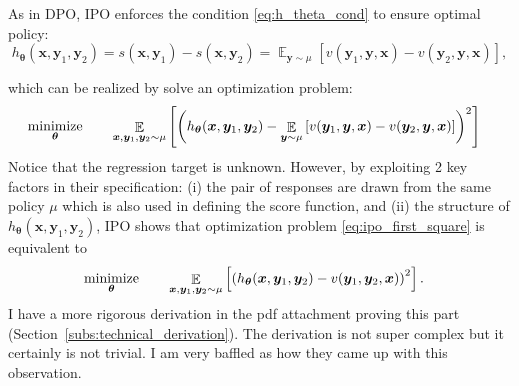 \documentclass[11pt,a4paper]{article}
\begin{document}
As in DPO, IPO enforces the condition \eqref{eq:h_theta_cond} to ensure optimal policy:
\[
h_{\boldsymbol \theta}(\bm{x}, \bm{y}_1, \bm{y}_2) = s(\bm{x}, \bm{y}_1) - s(\bm{x}, \bm{y}_2) = \mathop{\mathbb{E}}_{\bm{y} \sim \mu}[v(\bm{y}_1, \bm{y}, \bm{x}) - v(\bm{y}_2, \bm{y}, \bm{x})],
\]

which can be realized by solve an optimization problem:
\begin{alignat}{2}
    \label{eq:ipo_first_square}
    & \operatorname*{\text{minimize}}_{\boldsymbol \theta} \quad && \mathop{\mathbb{E}}_{\bm{x}, \bm{y}_1, \bm{y}_2\sim \mu} \left[ \left(  h_{\boldsymbol \theta}(\bm{x}, \bm{y}_1, \bm{y}_2)  - \mathop{\mathbb{E}}_{\bm{y} \sim \mu}\left[v(\bm{y}_1, \bm{y}, \bm{x}) - v(\bm{y}_2, \bm{y}, \bm{x}) \right] \right) ^2\right]
\end{alignat}
Notice that the regression target is unknown. However, by exploiting 2 key factors in their specification: (i) the pair of responses are drawn from the same policy $\mu$ which is also used in defining the score function, and (ii) the structure of $h_{\boldsymbol \theta}(\bm{x}, \bm{y}_1, \bm{y}_2)$, IPO shows that optimization problem \eqref{eq:ipo_first_square} is equivalent to
\begin{alignat}{2}
    \label{eq:ipo_square_2}
    & \operatorname*{\text{minimize}}_{\boldsymbol \theta} \quad && \mathop{\mathbb{E}}_{\bm{x}, \bm{y}_1, \bm{y}_2\sim \mu} \left[ \left(  h_{\boldsymbol \theta}(\bm{x}, \bm{y}_1, \bm{y}_2)  - v(\bm{y}_1, \bm{y}_2, \bm{x}) \right) ^2\right].
\end{alignat}
I have a more rigorous derivation in the pdf attachment proving this part (Section~\ref{subs:technical_derivation}). The derivation is not super complex but it certainly is not trivial. I am very baffled as how they came up with this observation. 
\end{document}
